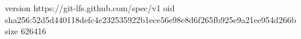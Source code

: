 version https://git-lfs.github.com/spec/v1
oid sha256:52d5d440118defc4e232535922b1ece56e98e8d6f265fb925e9a21ee954d266b
size 626416

